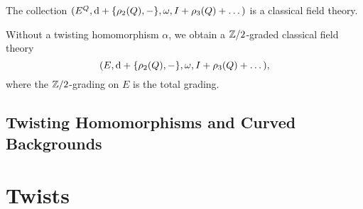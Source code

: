 \documentclass[10pt, oneside]{article}
\begin{document}
\begin{prop}
The collection $(E^Q, {\rm d} + \{\rho_2(Q), -\}, \omega, I + \rho_3(Q) + \dots)$ is a classical field theory.
\end{prop}

\begin{remark}
Without a twisting homomorphism $\alpha$, we obtain a $\mathbb Z/2$-graded classical field theory
\[(E, {\rm d} + \{\rho_2(Q), -\}, \omega, I + \rho_3(Q) + \dots),\]
where the $\mathbb Z/2$-grading on $E$ is the total grading.
\end{remark}

\subsection{Twisting Homomorphisms and Curved Backgrounds}


\section{Twists}
\end{document}
